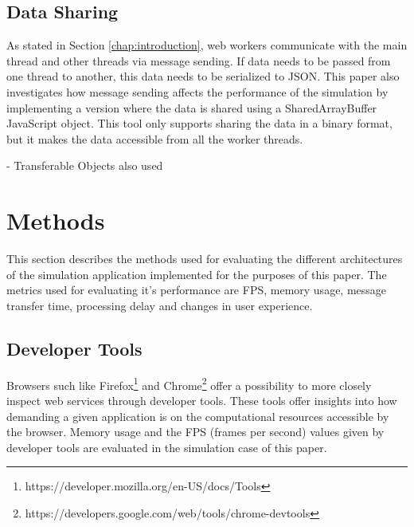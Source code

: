 \documentclass[conference]{IEEEtran}
\begin{document}


\subsection{Data Sharing}

As stated in Section \ref{chap:introduction}, web workers communicate with the main thread and other threads via message sending. If data needs to be passed from one thread
to another, this data needs to be serialized to JSON. This paper also investigates how message sending affects the performance of the simulation by implementing a version
where the data is shared using a SharedArrayBuffer JavaScript object. This tool only supports sharing the data in a binary format, but it makes the data accessible from all the worker threads.

- Transferable Objects also used

\section{Methods}
\label{sec:methods}

This section describes the methods used for evaluating the different architectures of the simulation application implemented for the purposes of this paper. The metrics used for evaluating it's performance are FPS, memory usage, message transfer time, processing delay and changes in user experience.

\subsection{Developer Tools}

Browsers such like Firefox\footnote{https://developer.mozilla.org/en-US/docs/Tools} and Chrome\footnote{https://developers.google.com/web/tools/chrome-devtools} offer a 
possibility to more closely inspect web services through developer tools. These tools offer insights into how demanding a given application
is on the computational resources accessible by the browser. Memory usage and the FPS (frames per second) values given by developer tools are evaluated in the simulation
case of this paper.
\end{document}
